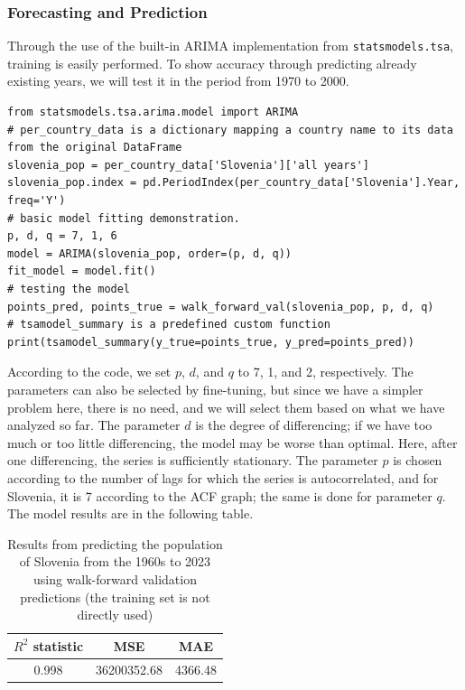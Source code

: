 \documentclass[a4paper,11pt]{article}
\begin{document}
\subsubsection{Forecasting and Prediction}
Through the use of the built-in ARIMA implementation from \texttt{statsmodels.tsa}, training is easily performed. To show accuracy through predicting already existing years, we will test it in the period from 1970 to 2000.
\vspace{.5cm}
\begin{lstlisting}[style=Python, caption=Code for fitting an ARIMA model for population]
from statsmodels.tsa.arima.model import ARIMA
# per_country_data is a dictionary mapping a country name to its data from the original DataFrame
slovenia_pop = per_country_data['Slovenia']['all years']
slovenia_pop.index = pd.PeriodIndex(per_country_data['Slovenia'].Year, freq='Y')
# basic model fitting demonstration.
p, d, q = 7, 1, 6
model = ARIMA(slovenia_pop, order=(p, d, q))
fit_model = model.fit()
# testing the model
points_pred, points_true = walk_forward_val(slovenia_pop, p, d, q)
# tsamodel_summary is a predefined custom function
print(tsamodel_summary(y_true=points_true, y_pred=points_pred))
\end{lstlisting}
According to the code, we set $p$, $d$, and $q$ to 7, 1, and 2, respectively. The parameters can also be selected by fine-tuning, but since we have a simpler problem here, there is no need, and we will select them based on what we have analyzed so far. The parameter $d$ is the degree of differencing; if we have too much or too little differencing, the model may be worse than optimal. Here, after one differencing, the series is sufficiently stationary. The parameter $p$ is chosen according to the number of lags for which the series is autocorrelated, and for Slovenia, it is 7 according to the ACF graph; the same is done for parameter $q$. The model results are in the following table.
\begin{table}[H]
\centering
\begin{tabular}{|c|c|c|}
\hline
\textbf{$R^2$ statistic} & \textbf{MSE} & \textbf{MAE} \\
\hline
0.998 & 36200352.68 & 4366.48 \\
\hline
\end{tabular}
\caption{Results from predicting the population of Slovenia from the 1960s to 2023 using walk-forward validation predictions (the training set is not directly used)}
\label{tab:arima-results}
\end{table}
\end{document}
